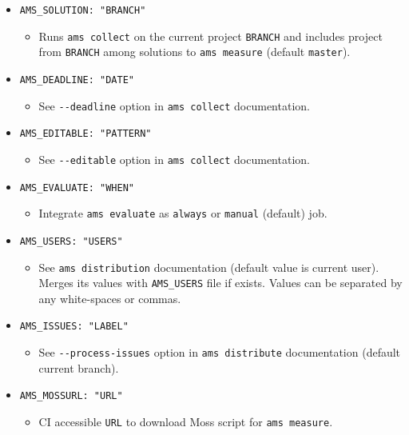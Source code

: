 \begin{itemize}
\item
  \texttt{AMS\_SOLUTION:\ "BRANCH"}

  \begin{itemize}
  \item
    Runs \texttt{ams\ collect} on the current project \texttt{BRANCH} and includes project from \texttt{BRANCH} among solutions to \texttt{ams\ measure} (default \texttt{master}).
  \end{itemize}
\item
  \texttt{AMS\_DEADLINE:\ "DATE"}

  \begin{itemize}
  \item
    See \texttt{-\/-deadline} option in \texttt{ams\ collect} documentation.
  \end{itemize}
\item
  \texttt{AMS\_EDITABLE:\ "PATTERN"}

  \begin{itemize}
  \item
    See \texttt{-\/-editable} option in \texttt{ams\ collect} documentation.
  \end{itemize}
\item
  \texttt{AMS\_EVALUATE:\ "WHEN"}

  \begin{itemize}
  \item
    Integrate \texttt{ams\ evaluate} as \texttt{always} or \texttt{manual} (default) job.
  \end{itemize}
\item
  \texttt{AMS\_USERS:\ "USERS"}

  \begin{itemize}
  \item
    See \texttt{ams\ distribution} documentation (default value is current user). Merges its values with \texttt{AMS\_USERS} file if exists. Values can be separated by any white-spaces or commas.
  \end{itemize}
\item
  \texttt{AMS\_ISSUES:\ "LABEL"}

  \begin{itemize}
  \item
    See \texttt{-\/-process-issues} option in \texttt{ams\ distribute} documentation (default current branch).
  \end{itemize}
\item
  \texttt{AMS\_MOSSURL:\ "URL"}

  \begin{itemize}
  \item
    CI accessible \texttt{URL} to download Moss script for \texttt{ams\ measure}.
  \end{itemize}
\end{itemize}
